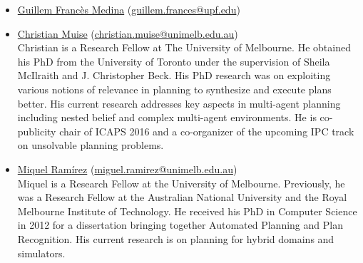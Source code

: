 \documentclass[10pt]{article}
\begin{document}
\begin{itemize}
\item \href{http://}{Guillem Francès Medina}
  (\href{mailto:guillem.frances@upf.edu}{guillem.frances@upf.edu})\\


\item \href{http://www.haz.ca/}{Christian Muise}
 (\href{mailto:christian.muise@unimelb.edu.au}{christian.muise@unimelb.edu.au})\\
Christian is a Research Fellow at The University of Melbourne. He obtained his PhD
from the University of Toronto under the supervision of Sheila McIlraith and J.
Christopher Beck. His PhD research was on exploiting various notions of relevance
in planning to synthesize and execute plans better. His current research addresses
key aspects in multi-agent planning including nested belief and complex multi-agent
environments. He is co-publicity chair of ICAPS 2016 and a co-organizer of the upcoming
IPC track on unsolvable planning problems.

%
\item \href{http://findanexpert.unimelb.edu.au/display/person778610#tab-overview}{Miquel Ram\'{i}rez}
  (\href{mailto:miguel.ramirez@unimelb.edu.au}{miguel.ramirez@unimelb.edu.au})\\
Miquel is a Research Fellow at the University of Melbourne. Previously, he was
a Research Fellow at the Australian National University and the Royal Melbourne
Institute of Technology. He
received his PhD in Computer Science in 2012 for a dissertation
bringing together Automated Planning and Plan Recognition. His current
research is on planning for hybrid domains and simulators.





\end{itemize}
\end{document}

